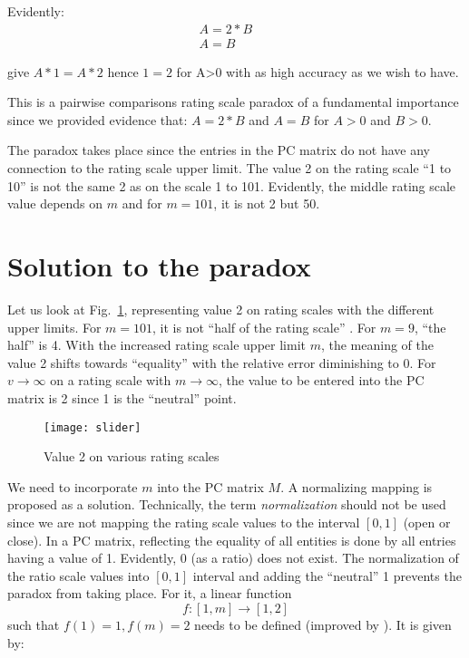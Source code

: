 \documentclass [12pt]{article}
\begin{document}
\noindent Evidently:
$$\begin{array}{lcl} 
A=2*B &  &  \\ A=B 
\end{array}$$

\noindent give $A*1=A*2$ hence $1=2$ for A>0 with as high accuracy as we wish to have.

This is a pairwise comparisons rating scale paradox of a fundamental importance since we provided evidence that: $A=2*B$ and $A=B$ for $A>0$ and $B>0$.

The paradox takes place since the entries in the PC matrix do not have any connection to the rating scale upper limit. The value 2 on the rating scale ``1 to 10'' is not the same 2 as on the scale 1 to 101.
Evidently, the middle rating scale value depends on $m$ and for $m=101$, it is not 2 but 50.

\section{Solution to the paradox}

Let us look at Fig.~\ref{fig:slider}, representing value 2 on rating scales with the different upper limits. For $m=101$, it is not ``half of the rating scale'' . For $m=9$, ``the half'' is 4. With the increased rating scale upper limit $m$, the meaning of the value 2 shifts towards ``equality'' with the relative error diminishing to 0. For $v \rightarrow \infty$ on a rating scale with $m \rightarrow \infty$, the value to be entered into the PC matrix is 2 since 1 is the ``neutral'' point.

\begin{figure}[p]
\centering
\texttt{[image: slider]}
\caption[scale9]{Value 2 on various rating scales}
\label{fig:slider}
\end{figure}



We need to incorporate $m$ into the PC matrix $M$.
A normalizing mapping is proposed as a solution. Technically, the term
\textit{normalization} should not be used since we are not mapping the rating scale values
to the interval $[0,1]$ (open or close). In a PC matrix, reflecting the equality of all entities is done by all entries having a value of 1. Evidently, 0 (as a ratio) does not exist.
The normalization of the ratio scale values into $[0, 1]$ interval and adding the ``neutral'' 1 prevents the paradox from taking place. For it, a linear function $$f:[1, m]\to [1,2]$$ such that $f(1)=1, f(m)=2$ needs to be defined (improved by \cite{EW}). It is given by:
\end{document}

